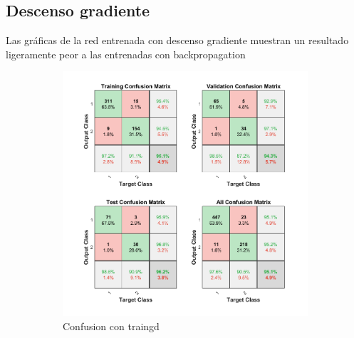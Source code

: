 \documentclass[a4paper, 12pt]{article}
\begin{document}
            \subsection{Descenso gradiente}
                Las gráficas de la red entrenada con descenso gradiente muestran un resultado ligeramente peor a las entrenadas con backpropagation
                \begin{figure}[htp!]
                    \caption{Gráficas con Descenso gradiente con división 70/15/15}
                    \begin{subfigure}{0.49\textwidth}
                        \centering
        		      \includegraphics[width=\textwidth]{figures/parte1/Ej4/ej4_confusion_traingd.png}
                        \caption{Confusion con traingd}
                    \end{subfigure}
                    \begin{subfigure}{0.49\textwidth}

\end{subfigure}
\end{figure}
\end{document}
